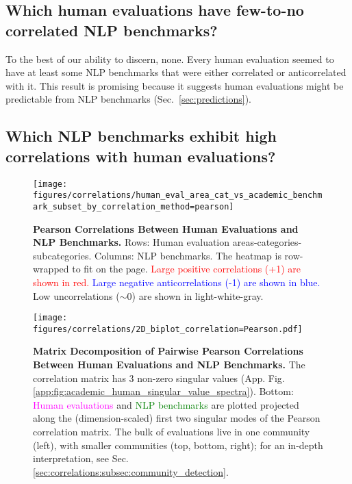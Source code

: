 \subsection{Which human evaluations have few-to-no correlated NLP benchmarks?}
\label{sec:correlations:subsec:nlp_benchmarks_no_correlations}

To the best of our ability to discern, none. Every human evaluation seemed to have at least some NLP benchmarks that were either correlated or anticorrelated with it. This result is promising because it suggests human evaluations might be predictable from NLP benchmarks (Sec.~\ref{sec:predictions}).  

\subsection{Which NLP benchmarks exhibit high correlations with human evaluations?}
\label{sec:correlations:subsec:nlp_benchmarks_highest_correlations}

\begin{figure*}[t!]
    \centering
    \texttt{[image: figures/correlations/human\_eval\_area\_cat\_vs\_academic\_benchmark\_subset\_by\_correlation\_method=pearson]}
    \caption{\textbf{Pearson Correlations Between Human Evaluations and NLP Benchmarks.} Rows: Human evaluation areas-categories-subcategories. Columns: NLP benchmarks. The heatmap is row-wrapped to fit on the page. \textcolor{red}{Large positive correlations (+1) are shown in red.} \textcolor{blue}{Large negative anticorrelations (-1) are shown in blue.} Low uncorrelations ($\sim$0) are shown in light-white-gray.}
    \label{fig:corr:microscopic}
\end{figure*}

\begin{figure*}[t!]
    \centering
    \texttt{[image: figures/correlations/2D\_biplot\_correlation=Pearson.pdf]}
    \caption{\textbf{Matrix Decomposition of Pairwise Pearson Correlations Between Human Evaluations and NLP Benchmarks.} The correlation matrix has 3 non-zero singular values (App. Fig. \ref{app:fig:academic_human_singular_value_spectra}). Bottom: \textcolor{Magenta}{Human evaluations} and \textcolor{Green}{NLP benchmarks} are plotted projected along the (dimension-scaled) first two singular modes of the Pearson correlation matrix. The bulk of evaluations live in one community (left), with smaller communities (top, bottom, right); for an in-depth interpretation, see Sec. \ref{sec:correlations:subsec:community_detection}.}
    \label{fig:corr:singular_modes}
\end{figure*}


